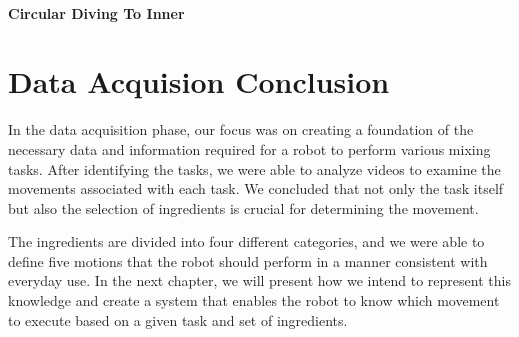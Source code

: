 \paragraph{Circular Diving To Inner}

\section{Data Acquision Conclusion}

In the data acquisition phase, our focus was on creating a foundation of the necessary data and information required for a robot to perform various mixing tasks. After identifying the tasks, we were able to analyze videos to examine the movements associated with each task. We concluded that not only the task itself but also the selection of ingredients is crucial for determining the movement.

The ingredients are divided into four different categories, and we were able to define five motions that the robot should perform in a manner consistent with everyday use. In the next chapter, we will present how we intend to represent this knowledge and create a system that enables the robot to know which movement to execute based on a given task and set of ingredients.
\newpage